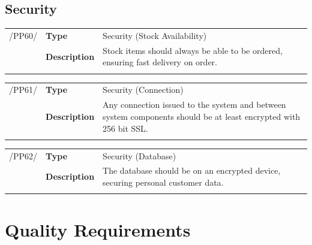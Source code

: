 \documentclass[11pt,a4paper,oneside,svgnames]{report}
\begin{document}
\section{Security}
\noindent
\begin{tabular}{llp{10cm}}
\cellcolor{white}/PP60/	& \textbf{Type}			& Security (Stock Availability)\\
\cellcolor{white}		& \textbf{Description}	& Stock items should always be able to be ordered, ensuring fast delivery on order.\\
\cellcolor{white}		\hfill \\
\end{tabular}

\noindent
\begin{tabular}{llp{10cm}}
\cellcolor{white}/PP61/	& \textbf{Type}			& Security (Connection)\\
\cellcolor{white}		& \textbf{Description}	& Any connection issued to the system and between system components should be at least encrypted with 256 bit SSL.\\
\cellcolor{white}		\hfill \\
\end{tabular}

\noindent
\begin{tabular}{llp{10cm}}
\cellcolor{white}/PP62/	& \textbf{Type}			& Security (Database)\\
\cellcolor{white}		& \textbf{Description}	& The database should be on an encrypted device, securing personal customer data.\\
\cellcolor{white}		\hfill \\
\end{tabular}

\chapter{Quality Requirements}
\end{document}
